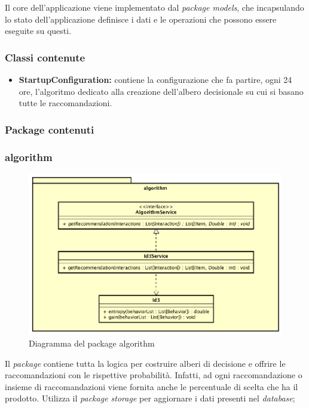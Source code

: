 Il core dell'applicazione viene implementato dal \textit{package models}, che incapsulando lo stato dell'applicazione definisce i dati e le operazioni che possono essere eseguite su questi.

\newpage
\subsubsection*{Classi contenute}
\begin{itemize}
	\item \textbf{StartupConfiguration:} contiene la configurazione che fa partire, ogni 24 ore, l'algoritmo dedicato alla creazione dell'albero decisionale su cui si basano tutte le raccomandazioni.
\end{itemize}

\subsubsection*{Package contenuti}
	
	\subsubsection*{algorithm}
	\begin{figure}[h]
	\centering
	\includegraphics[width=0.8\linewidth]{immagini/tres-algorithm}
	\caption[Diagramma del package algorithm]{Diagramma del package algorithm}
	\label{fig:tres-algorithm}
	\end{figure}
	Il \textit{package} contiene tutta la logica per costruire alberi di decisione e offrire le raccomandazioni con le rispettive probabilità. Infatti, ad ogni raccomandazione o insieme di raccomandazioni viene fornita anche le percentuale di scelta che ha il prodotto. Utilizza il \textit{package storage} per aggiornare i dati presenti nel \textit{database};
	
